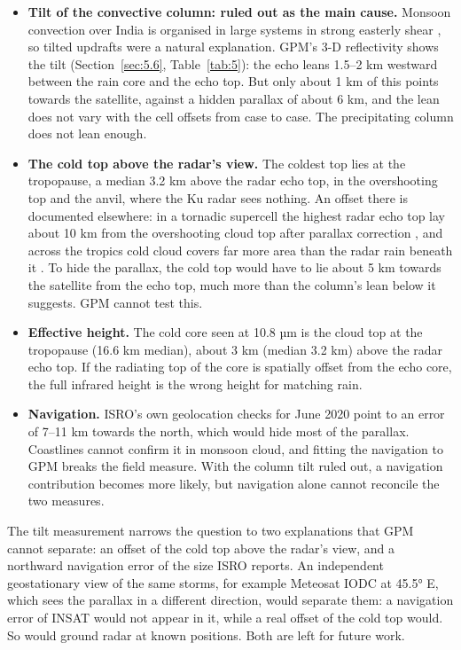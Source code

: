 \begin{itemize}
\tightlist
\item
  \textbf{Tilt of the convective column: ruled out as the main cause.} Monsoon convection over India is organised in large systems in strong easterly shear \citep{houze2007,romatschke2011}, so tilted updrafts were a natural explanation. GPM's 3-D reflectivity shows the tilt (Section~\ref{sec:5.6}, Table~\ref{tab:5}): the echo leans 1.5--2 km westward between the rain core and the echo top. But only about 1 km of this points towards the satellite, against a hidden parallax of about 6 km, and the lean does not vary with the cell offsets from case to case. The precipitating column does not lean enough.
\item
  \textbf{The cold top above the radar's view.} The coldest top lies at the tropopause, a median 3.2 km above the radar echo top, in the overshooting top and the anvil, where the Ku radar sees nothing. An offset there is documented elsewhere: in a tornadic supercell the highest radar echo top lay about 10 km from the overshooting cloud top after parallax correction \citep{bluestein2019}, and across the tropics cold cloud covers far more area than the radar rain beneath it \citep{liu2007}. To hide the parallax, the cold top would have to lie about 5 km towards the satellite from the echo top, much more than the column's lean below it suggests. GPM cannot test this.
\item
  \textbf{Effective height.} The cold core seen at 10.8 µm is the cloud top at the tropopause (16.6 km median), about 3 km (median 3.2 km) above the radar echo top. If the radiating top of the core is spatially offset from the echo core, the full infrared height is the wrong height for matching rain.
\item
  \textbf{Navigation.} ISRO's own geolocation checks for June 2020 point to an error of 7--11 km towards the north, which would hide most of the parallax. Coastlines cannot confirm it in monsoon cloud, and fitting the navigation to GPM breaks the field measure. With the column tilt ruled out, a navigation contribution becomes more likely, but navigation alone cannot reconcile the two measures.
\end{itemize}

The tilt measurement narrows the question to two explanations that GPM cannot separate: an offset of the cold top above the radar's view, and a northward navigation error of the size ISRO reports. An independent geostationary view of the same storms, for example Meteosat IODC at 45.5° E, which sees the parallax in a different direction, would separate them: a navigation error of INSAT would not appear in it, while a real offset of the cold top would. So would ground radar at known positions. Both are left for future work.

